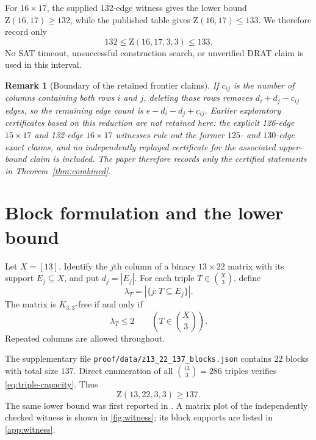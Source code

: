 \documentclass[11pt]{amsart}
\newtheorem{remark}[theorem]{Remark}
\newcommand{\Z}{\mathrm Z}
\begin{document}
For $16\times17$, the supplied 132-edge witness gives the lower bound
$\Z(16,17)\ge132$, while the published table gives $\Z(16,17)\le133$.
We therefore record only
\[
  132\le\Z(16,17,3,3)\le133.
\]
No SAT timeout, unsuccessful construction search, or unverified DRAT claim
is used in this interval.

\begin{remark}[Boundary of the retained frontier claims]
If $c_{ij}$ is the number of columns containing both rows $i$ and $j$,
deleting those rows removes $d_i+d_j-c_{ij}$ edges, so the remaining edge
count is $e-d_i-d_j+c_{ij}$. Earlier exploratory certificates based on this
reduction are not retained here: the explicit 126-edge $15\times17$ and
132-edge $16\times17$ witnesses rule out the former $125$- and $130$-edge
exact claims, and no independently replayed certificate for the associated
upper-bound claim is included. The paper therefore records only the certified
statements in Theorem~\ref{thm:combined}.
\end{remark}

\section{Block formulation and the lower bound}
Let $X=[13]$. Identify the $j$th column of a binary $13\times22$ matrix with its support $E_j\subseteq X$, and put $d_j=|E_j|$. For each triple $T\in\binom{X}{3}$, define
\[
  \lambda_T=|\{j:T\subseteq E_j\}|.
\]
The matrix is $K_{3,3}$-free if and only if
\begin{equation}\label{eq:triple-capacity}
  \lambda_T\le2 \qquad(T\in\binom{X}{3}).
\end{equation}
Repeated columns are allowed throughout.

The supplementary file \texttt{proof/data/z13\_22\_137\_blocks.json} contains $22$ blocks with total size $137$. Direct enumeration of all $\binom{13}{3}=286$ triples verifies \eqref{eq:triple-capacity}. Thus
\begin{equation}\label{eq:lower}
  \Z(13,22,3,3)\ge137.
\end{equation}
The same lower bound was first reported in \cite{BhanNobiliLanger2026}. A matrix plot of the independently checked witness is shown in \cref{fig:witness}; its block supports are listed in \cref{app:witness}.
\end{document}
